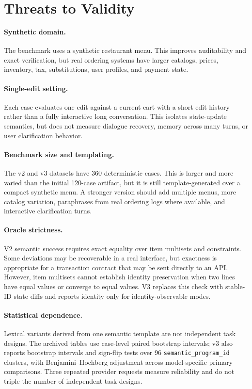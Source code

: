 \documentclass[11pt]{article}
\begin{document}
\section{Threats to Validity}
\paragraph{Synthetic domain.}
The benchmark uses a synthetic restaurant menu. This improves auditability and
exact verification, but real ordering systems have larger catalogs, prices,
inventory, tax, substitutions, user profiles, and payment state.

\paragraph{Single-edit setting.}
Each case evaluates one edit against a current cart with a short edit history
rather than a fully interactive long conversation. This isolates state-update
semantics, but does not measure dialogue recovery, memory across many turns, or
user clarification behavior.

\paragraph{Benchmark size and templating.}
The v2 and v3 datasets have 360 deterministic cases. This is larger and more varied
than the initial 120-case artifact, but it is still template-generated over a
compact synthetic menu. A stronger version should add multiple menus, more
catalog variation, paraphrases from real ordering logs where available, and
interactive clarification turns.

\paragraph{Oracle strictness.}
V2 semantic success requires exact equality over item multisets and constraints.
Some deviations may be recoverable in a real interface, but exactness is
appropriate for a transaction contract that may be sent directly to an API.
However, item multisets cannot establish identity preservation when two lines
have equal values or converge to equal values. V3 replaces this check with
stable-ID state diffs and reports identity only for identity-observable modes.

\paragraph{Statistical dependence.}
Lexical variants derived from one semantic template are not independent task
designs. The archived tables use case-level paired bootstrap intervals; v3 also
reports bootstrap intervals and sign-flip tests over 96
\texttt{semantic\_program\_id} clusters, with Benjamini--Hochberg adjustment
across model-specific primary comparisons. Three repeated provider requests
measure reliability and do not triple the number of independent task designs.
\end{document}
